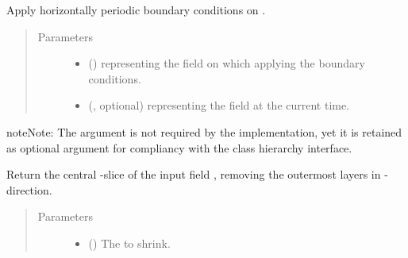 \documentclass[letterpaper,10pt,english]{sphinxmanual}
\begin{document}
\begin{fulllineitems}
\begin{fulllineitems}
\label{\detokenize{api:dycore.horizontal_boundary.PeriodicXZ.apply}}
Apply horizontally periodic boundary conditions on .
\begin{quote}\begin{description}
\item[{Parameters}] \leavevmode\begin{itemize}
\item {} 
 () \textendash{}  representing the field on which applying the boundary conditions.

\item {} 
 (, optional) \textendash{}  representing the field at the current time.

\end{itemize}

\end{description}\end{quote}

\begin{sphinxadmonition}{note}{Note:}
The argument  is not required by the implementation, yet it is retained as optional
argument for compliancy with the class hierarchy interface.
\end{sphinxadmonition}

\end{fulllineitems}


\begin{fulllineitems}
\label{\detokenize{api:dycore.horizontal_boundary.PeriodicXZ.from_computational_to_physical_domain}}
Return the central -slice of the input field , removing the  outermost
layers in -direction.
\begin{quote}\begin{description}
\item[{Parameters}] \leavevmode\begin{itemize}
\item {} 
 () \textendash{} The  to shrink.


\end{itemize}
\end{description}
\end{quote}
\end{fulllineitems}
\end{fulllineitems}
\end{document}

